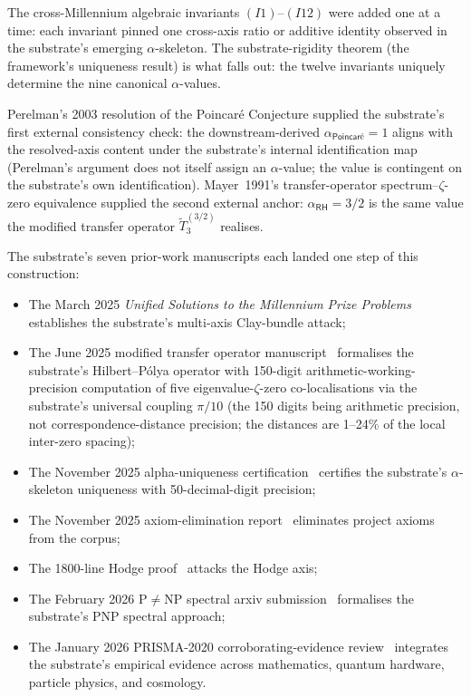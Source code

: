 \documentclass[11pt,a4paper]{amsart}
\theoremstyle{plain}
\theoremstyle{definition}
\begin{document}
The cross-Millennium algebraic invariants $(I1)$--$(I12)$ were added one at a time: each invariant pinned one cross-axis ratio or additive identity observed in the substrate's emerging $\alpha$-skeleton. The substrate-rigidity theorem (the framework's uniqueness result) is what falls out: the twelve invariants uniquely determine the nine canonical $\alpha$-values.

Perelman's 2003 resolution of the Poincar\'e Conjecture supplied the substrate's first external consistency check: the downstream-derived $\alpha_{\textsf{Poincar\'e}}=1$ aligns with the resolved-axis content under the substrate's internal identification map (Perelman's argument does not itself assign an $\alpha$-value; the value is contingent on the substrate's own identification). Mayer~1991's transfer-operator spectrum--$\zeta$-zero equivalence supplied the second external anchor: $\alpha_{\textsf{RH}}=3/2$ is the same value the modified transfer operator $\widetilde{T}_3^{(3/2)}$ realises.

The substrate's seven prior-work manuscripts each landed one step of this construction:
\begin{itemize}[itemsep=2pt]
\item The March 2025 \emph{Unified Solutions to the Millennium Prize Problems}~\cite{cohen2025unifiedClay} establishes the substrate's multi-axis Clay-bundle attack;
\item The June 2025 modified transfer operator manuscript~\cite{cohen2025transferOp} formalises the substrate's Hilbert--P\'olya operator with 150-digit arithmetic-working-precision computation of five eigenvalue-$\zeta$-zero co-localisations via the substrate's universal coupling $\pi/10$ (the 150 digits being arithmetic precision, not correspondence-distance precision; the distances are 1--24\% of the local inter-zero spacing);
\item The November 2025 alpha-uniqueness certification~\cite{cohen2025alphaUniqueness} certifies the substrate's $\alpha$-skeleton uniqueness with 50-decimal-digit precision;
\item The November 2025 axiom-elimination report~\cite{cohen2025axiomElim} eliminates project axioms from the corpus;
\item The 1800-line Hodge proof~\cite{cohen2025hodgeProof} attacks the Hodge axis;
\item The February 2026 P$\neq$NP spectral arxiv submission~\cite{cohen2026pnpSpectral} formalises the substrate's PNP spectral approach;
\item The January 2026 PRISMA-2020 corroborating-evidence review~\cite{cohen2026corroborating} integrates the substrate's empirical evidence across mathematics, quantum hardware, particle physics, and cosmology.
\end{itemize}
\end{document}
